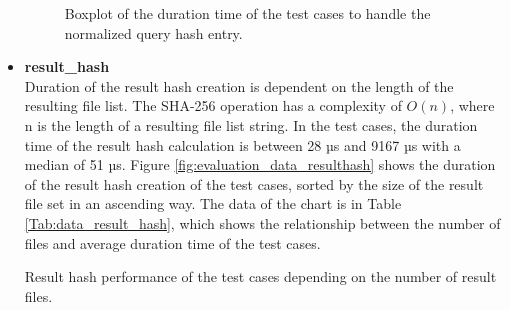 \documentclass[draft,final]{vutinfth} %
\begin{document}
\begin{itemize}
	\begin{figure}[!h]
		\centering
		\caption{Boxplot of the duration time of the test cases to handle the normalized query hash entry.}
		\label{fig:evaluation_perf_norm_hash}
	\end{figure}
	\item \textbf{result\_hash} \\
	Duration of the result hash creation is dependent on the length of the resulting file list. The SHA-256 operation has a complexity of $O(n)$, where n is the length of a resulting file list string. In the test cases, the duration time of the result hash calculation is between 28 µs and 9167 µs with a median of 51 µs. Figure \ref{fig:evaluation_data_resulthash} shows the duration of the result hash creation of the test cases, sorted by the size of the result file set in an ascending way. The data of the chart is in Table \ref{Tab:data_result_hash}, which shows the relationship between the number of files and average duration time of the test cases.  
	
	\begin{table}[]
		\caption{Result hash performance of the test cases depending on the number of result files.}
		

\end{table}
\end{itemize}
\end{document}
